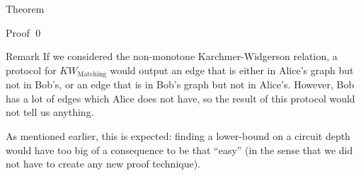 \documentclass[a4paper]{article}
\begin{document}
\begin{parag}{Theorem}
\begin{subparag}{Proof}
        \qed
    \end{subparag}

    \begin{subparag}{Remark}
        If we considered the non-monotone Karchmer-Widgerson relation, a protocol for $KW_{\text{Matching}}$ would output an edge that is either in Alice's graph but not in Bob's, or an edge that is in Bob's graph but not in Alice's. However, Bob has a lot of edges which Alice does not have, so the result of this protocol would not tell us anything.

        As mentioned earlier, this is expected: finding a lower-bound on a circuit depth would have too big of a consequence to be that ``easy'' (in the sense that we did not have to create any new proof technique).
    \end{subparag}
\end{parag}
\end{document}
